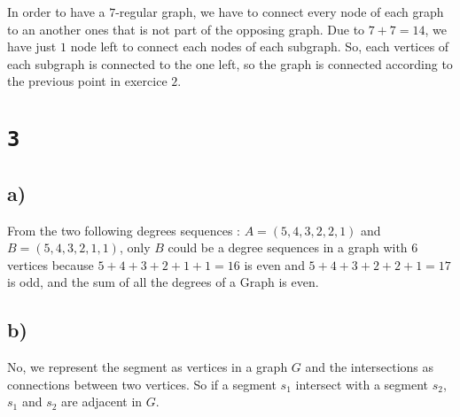 \documentclass[a4paper,11pt]{report}
\begin{document}
\begin{minipage}{0.49\textwidth}
  \begin{center}
  \end{center}
  \end{minipage}
  \begin{minipage}{0.49\textwidth}
  \begin{center}
  \end{center}
\end{minipage}

In order to have a $7$-regular graph, we have to connect every node of each
graph to an another ones that is not part of the opposing graph. Due to $7 + 7 =
14$, we have just $1$ node left to connect each nodes of each subgraph. So, each
vertices of each subgraph is connected to the one left, so the graph is
connected according to the previous point in exercice $2$.

\section*{\texttt{3}}
\subsection*{a)}

From the two following degrees sequences : $A = (5,4,3,2,2,1)$ and $B =
(5,4,3,2,1,1)$, only $B$ could be a degree sequences in a graph with $6$
vertices because $5+4+3+2+1+1 = 16$ is even and $5+4+3+2+2+1 = 17$ is odd, and
the sum of all the degrees of a Graph is even.

\subsection*{b)}

No, we represent the segment as vertices in a graph $G$ and the intersections as
connections between two vertices. So if a segment $s_1$ intersect with a segment
$s_2$, $s_1$ and $s_2$ are adjacent in $G$.
\end{document}

